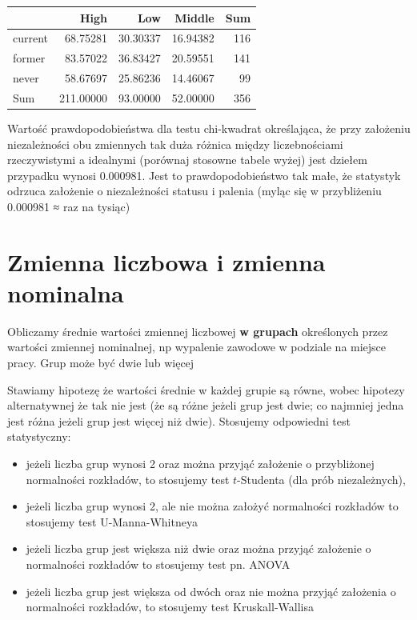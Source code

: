 \documentclass[
  openany]{book}
\begin{document}
\begin{example}
\begin{tabular}{l|r|r|r|r}
\hline
  & High & Low & Middle & Sum\\
\hline
current & 68.75281 & 30.30337 & 16.94382 & 116\\
\hline
former & 83.57022 & 36.83427 & 20.59551 & 141\\
\hline
never & 58.67697 & 25.86236 & 14.46067 & 99\\
\hline
Sum & 211.00000 & 93.00000 & 52.00000 & 356\\
\hline
\end{tabular}

Wartość prawdopodobieństwa dla testu chi-kwadrat określająca, że przy założeniu niezależności obu zmiennych tak duża różnica między liczebnościami rzeczywistymi a idealnymi
(porównaj stosowne tabele wyżej) jest dziełem przypadku wynosi 0.000981.
Jest to prawdopodobieństwo tak małe, że statystyk odrzuca założenie o niezależności
statusu i palenia (myląc się w przybliżeniu 0.000981 ≈ raz na tysiąc)
\end{example}

\hypertarget{zmienna-liczbowa-i-zmienna-nominalna}{%
\section{Zmienna liczbowa i zmienna nominalna}\label{zmienna-liczbowa-i-zmienna-nominalna}}

Obliczamy średnie wartości zmiennej liczbowej \textbf{w grupach} określonych przez wartości zmiennej nominalnej,
np wypalenie zawodowe w podziale na miejsce pracy. Grup może być dwie lub więcej

Stawiamy hipotezę że wartości średnie w każdej grupie są równe, wobec hipotezy alternatywnej
że tak nie jest (że są różne jeżeli grup jest dwie; co najmniej jedna jest różna jeżeli grup jest
więcej niż dwie). Stosujemy odpowiedni test statystyczny:

\begin{itemize}
\item
  jeżeli liczba grup wynosi 2 oraz można przyjąć założenie o przybliżonej
  normalności rozkładów, to stosujemy test \(t\)-Studenta (dla prób niezależnych),
\item
  jeżeli liczba grup wynosi 2, ale nie można założyć normalności
  rozkładów to stosujemy test U-Manna-Whitneya
\item
  jeżeli liczba grup jest większa niż dwie oraz można przyjąć założenie
  o normalności rozkładów to stosujemy test pn. ANOVA
\item
  jeżeli liczba grup jest większa od dwóch oraz nie można przyjąć założenia
  o normalności rozkładów, to stosujemy test Kruskall-Wallisa
\end{itemize}
\end{document}
